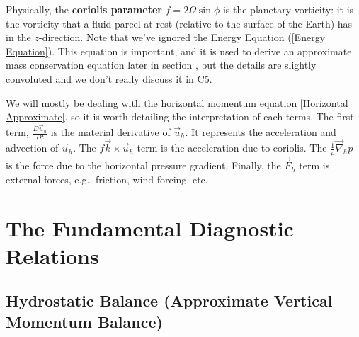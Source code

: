 Physically, the \textbf{coriolis parameter} $f=2\Omega \sin \phi$ is the planetary vorticity: it is the vorticity that a fluid parcel at rest (relative to the surface of the Earth) has in the $z$-direction. Note that we've ignored the Energy Equation (\ref{Energy Equation}). This equation is important, and it is used to derive an approximate mass conservation equation later in section , but the details are slightly convoluted and we don't really discuss it in C5.

We will mostly be dealing with the horizontal momentum equation \ref{Horizontal Approximate}, so it is worth detailing the interpretation of each terms. The first term, $\frac{D\vec{u}_h}{Dt}$ is the material derivative of $\vec{u}_h$. It represents the acceleration and advection of $\vec{u}_h$. The $f\vec{k}\times\vec{u}_h$ term is the acceleration due to coriolis. The $\frac{1}{\rho}\vec{\nabla}_h p$ is the force due to the horizontal pressure gradient. Finally, the $\vec{F}_h$ term is external forces, e.g., friction, wind-forcing, etc.

\chapter{The Fundamental Diagnostic Relations}\label{Dia Relations}

\section{Hydrostatic Balance (Approximate Vertical Momentum Balance)}\label{App Vert Bal}

